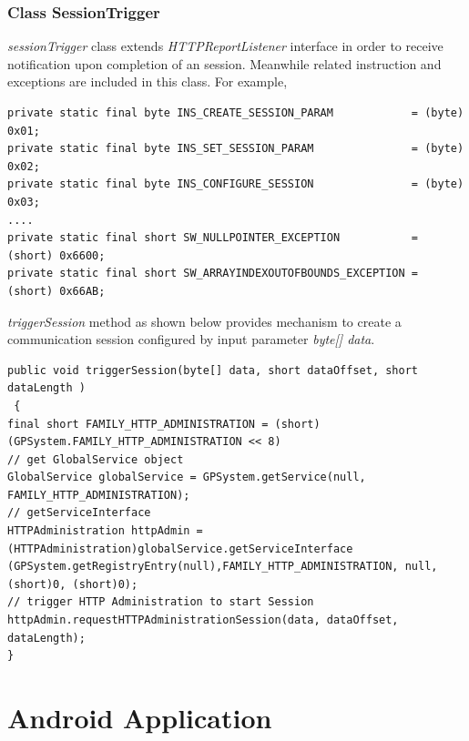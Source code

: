 \subsubsection{Class SessionTrigger}
\emph{sessionTrigger} class extends \emph{HTTPReportListener} interface in order to receive notification upon completion of an session. Meanwhile related instruction and exceptions are included in this class. For example,
\begin{Verbatim}[fontsize=\relsize{-1}]
private static final byte INS_CREATE_SESSION_PARAM            = (byte) 0x01;
private static final byte INS_SET_SESSION_PARAM               = (byte) 0x02;
private static final byte INS_CONFIGURE_SESSION               = (byte) 0x03;
....
private static final short SW_NULLPOINTER_EXCEPTION           = (short) 0x6600;
private static final short SW_ARRAYINDEXOUTOFBOUNDS_EXCEPTION = (short) 0x66AB;
\end{Verbatim}
\emph{triggerSession} method as shown below provides mechanism to create a communication session configured by input parameter \emph{byte[] data}.
\begin{Verbatim}[fontsize=\relsize{-1}, frame=lines,framesep=4mm, label=\fbox{\small\emph{Trigger Session}}]
public void triggerSession(byte[] data, short dataOffset, short dataLength )
 {
final short FAMILY_HTTP_ADMINISTRATION = (short) (GPSystem.FAMILY_HTTP_ADMINISTRATION << 8)
// get GlobalService object
GlobalService globalService = GPSystem.getService(null, FAMILY_HTTP_ADMINISTRATION);
// getServiceInterface
HTTPAdministration httpAdmin = (HTTPAdministration)globalService.getServiceInterface
(GPSystem.getRegistryEntry(null),FAMILY_HTTP_ADMINISTRATION, null, (short)0, (short)0);
// trigger HTTP Administration to start Session
httpAdmin.requestHTTPAdministrationSession(data, dataOffset, dataLength);
}
\end{Verbatim}

\section{Android Application}
